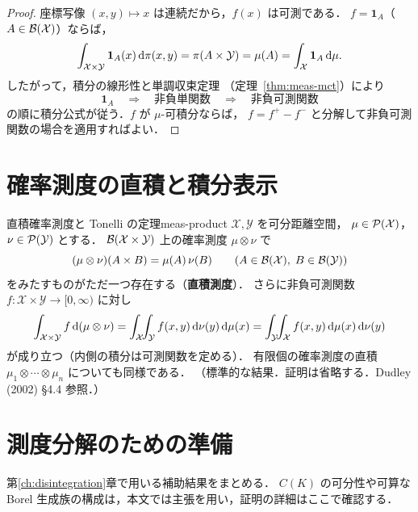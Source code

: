 \begin{proof}
  座標写像 $(x,y)\mapsto x$ は連続だから，$f(x)$ は可測である．
  $f=\mathbf{1}_A$（$A\in\mathcal{B}(\mathcal{X})$）ならば，
  \[
    \int_{\mathcal{X}\times\mathcal{Y}}\mathbf{1}_A(x)\,\mathrm{d}\pi(x,y)
    =\pi(A\times\mathcal{Y})
    =\mu(A)
    =\int_{\mathcal{X}}\mathbf{1}_A\,\mathrm{d}\mu.
  \]
  したがって，積分の線形性と単調収束定理
  （定理~\ref{thm:meas-mct}）により
  \[
    \mathbf{1}_A
    \quad\Longrightarrow\quad
    \text{非負単関数}
    \quad\Longrightarrow\quad
    \text{非負可測関数}
  \]
  の順に積分公式が従う．$f$ が $\mu$-可積分ならば，
  $f=f^+-f^-$ と分解して非負可測関数の場合を適用すればよい．
\end{proof}

\section{確率測度の直積と積分表示}

\begin{theorem}{直積確率測度と Tonelli の定理}{meas-product}
  $\mathcal{X},\mathcal{Y}$ を可分距離空間，
  $\mu\in\mathcal{P}(\mathcal{X})$，$\nu\in\mathcal{P}(\mathcal{Y})$ とする．
  $\mathcal{B}(\mathcal{X}\times \mathcal{Y})$ 上の確率測度 $\mu\otimes\nu$ で
  \[
    (\mu\otimes\nu)(A\times B)=\mu(A)\,\nu(B)
    \qquad(A\in\mathcal{B}(\mathcal{X}),\;B\in\mathcal{B}(\mathcal{Y}))
  \]
  をみたすものがただ一つ存在する（\textbf{直積測度}）．
  さらに非負可測関数 $f\colon \mathcal{X}\times \mathcal{Y}\to[0,\infty)$ に対し
  \[
    \int_{\mathcal{X}\times \mathcal{Y}}f\,\mathrm{d}(\mu\otimes\nu)
    =\int_{\mathcal{X}}\!\!\int_{\mathcal{Y}} f(x,y)\,\mathrm{d}\nu(y)\,\mathrm{d}\mu(x)
    =\int_{\mathcal{Y}}\!\!\int_{\mathcal{X}} f(x,y)\,\mathrm{d}\mu(x)\,\mathrm{d}\nu(y)
  \]
  が成り立つ（内側の積分は可測関数を定める）．
  有限個の確率測度の直積
  $\mu_1\otimes\cdots\otimes\mu_n$ についても同様である．
  （標準的な結果．証明は省略する．Dudley (2002) §4.4 参照．）
\end{theorem}

\section{測度分解のための準備}

第\ref{ch:disintegration}章で用いる補助結果をまとめる．
$C(K)$ の可分性や可算な Borel 生成族の構成は，本文では主張を用い，証明の詳細はここで確認する．

